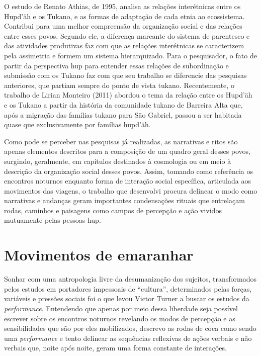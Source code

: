 O estudo de Renato Athias, de 1995, analisa as relações interétnicas
entre os Hupd'äh e os Tukano, e as formas de adaptação de cada etnia ao
ecossistema. Contribui para uma melhor compreensão da organização social
e das relações entre esses povos. Segundo ele, a diferença marcante do
sistema de parentesco e das atividades produtivas faz com que as
relações interétnicas se caracterizem pela assimetria e formem um
sistema hierarquizado. Para o pesquisador, o fato de partir da
perspectiva hup para entender essas relações de subordinação e submissão
com os Tukano faz com que seu trabalho se diferencie das pesquisas
anteriores, que partiam sempre do ponto de vista tukano. Recentemente, o
trabalho de Lirian Monteiro (2011) abordou o tema da relação entre os
Hupd'äh e os Tukano a partir da história da comunidade tukano de
Barreira Alta que, após a migração das famílias tukano para São Gabriel,
passou a ser habitada quase que exclusivamente por famílias hupd'äh.

Como pode se perceber nas pesquisas já realizadas, as narrativas e ritos
são apenas elementos descritos para a composição de um quadro geral
desses povos, surgindo, geralmente, em capítulos destinados à cosmologia
ou em meio à descrição da organização social desses povos. Assim,
tomando como referência os encontros noturnos enquanto forma de
interação social específica, articulada aos movimentos das viagens, o
trabalho que desenvolvi procura delinear o modo como narrativas e
andanças geram importantes condensações rituais que entrelaçam rodas,
caminhos e paisagens como campos de percepção e ação vividos mutuamente
pelas pessoas hup.

\section{Movimentos de emaranhar}\label{movimentos-de-emaranhar}

Sonhar com uma antropologia livre da desumanização dos sujeitos,
transformados pelos estudos em portadores impessoais de ``cultura'',
determinados pelas forças, variáveis e pressões sociais foi o que levou
Victor Turner a buscar os estudos da \textit{performance}. Entendendo que
apenas por meio dessa liberdade seja possível escrever sobre os
encontros noturnos revelando os modos de percepção e as sensibilidades
que são por eles mobilizados, descrevo as rodas de coca como sendo uma
\textit{performance} e tento delinear as sequências reflexivas de ações
verbais e não verbais que, noite após noite, geram uma forma constante
de interações.

